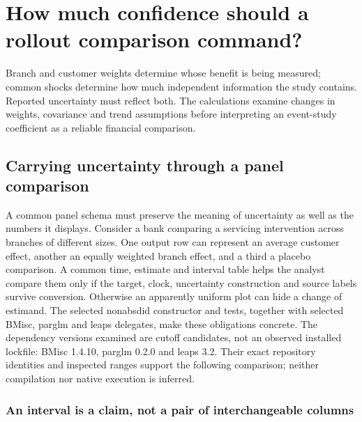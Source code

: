 \chapter{How much confidence should a rollout comparison command?}
Branch and customer weights determine whose benefit is being measured;
common shocks determine how much independent information the study contains.
Reported uncertainty must reflect both. The calculations examine changes in
weights, covariance and trend assumptions before interpreting an event-study
coefficient as a reliable financial comparison.



\section{Carrying uncertainty through a panel comparison}
\label{sec:exec29-panel-inference-contracts}

A common panel schema must preserve the meaning of uncertainty as well as the numbers it displays. Consider a bank comparing a servicing intervention across branches of different sizes. One output row can represent an average customer effect, another an equally weighted branch effect, and a third a placebo comparison. A common time, estimate and interval table helps the analyst compare them only if the target, clock, uncertainty construction and source labels survive conversion. Otherwise an apparently uniform plot can hide a change of estimand. The selected nonabsdid constructor and tests, together with selected BMisc, parglm and leaps delegates, make these obligations concrete. The dependency versions examined are cutoff candidates, not an observed installed lockfile: BMisc 1.4.10, parglm 0.2.0 and leaps 3.2. Their exact repository identities and inspected ranges support the following comparison; neither compilation nor native execution is inferred.~\citep{exec29_panel_inference_sources}

\subsection{An interval is a claim, not a pair of interchangeable columns}


